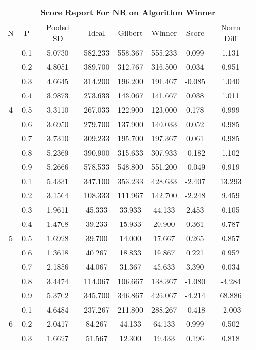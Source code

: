 \documentclass[11pt,a4paper]{report}
\begin{document}
\begin{longtable}{ | c | c || c | c | c | c | c | c | }
\hline
\multicolumn{8}{|c|}{ Score Report For NR on Algorithm Winner} \\
\hline
N & P & Pooled SD &  Ideal &  Gilbert & Winner  & Score & Norm Diff \\
 \hline
 \hline
 \endhead
\multirow{9}{*}{4} & 0.1 & 5.0730 & 582.233 & 558.367 & 555.233 & 0.099 & 1.131 \\
 & 0.2 & 4.8051 & 389.700 & 312.767 & 316.500 & 0.034 & 0.951 \\
 & 0.3 & 4.6645 & 314.200 & 196.200 & 191.467 & -0.085 & 1.040 \\
 & 0.4 & 3.9873 & 273.633 & 143.067 & 141.667 & 0.038 & 1.011 \\
 & 0.5 & 3.3110 & 267.033 & 122.900 & 123.000 & 0.178 & 0.999 \\
 & 0.6 & 3.6950 & 279.700 & 137.900 & 140.033 & 0.052 & 0.985 \\
 & 0.7 & 3.7310 & 309.233 & 195.700 & 197.367 & 0.061 & 0.985 \\
 & 0.8 & 5.2369 & 390.900 & 315.633 & 307.933 & -0.182 & 1.102 \\
 & 0.9 & 5.2666 & 578.533 & 548.800 & 551.200 & -0.049 & 0.919 \\
 \hline
\multirow{9}{*}{5} & 0.1 & 5.4331 & 347.100 & 353.233 & 428.633 & -2.407 & 13.293 \\
 & 0.2 & 3.1564 & 108.333 & 111.967 & 142.700 & -2.248 & 9.459 \\
 & 0.3 & 1.9611 & 45.333 & 33.933 & 44.133 & 2.453 & 0.105 \\
 & 0.4 & 1.4708 & 39.233 & 15.933 & 20.900 & 0.361 & 0.787 \\
 & 0.5 & 1.6928 & 39.700 & 14.000 & 17.667 & 0.265 & 0.857 \\
 & 0.6 & 1.3618 & 40.267 & 18.833 & 19.867 & 0.221 & 0.952 \\
 & 0.7 & 2.1856 & 44.067 & 31.367 & 43.633 & 3.390 & 0.034 \\
 & 0.8 & 3.4474 & 114.067 & 106.667 & 138.367 & -1.080 & -3.284 \\
 & 0.9 & 5.3702 & 345.700 & 346.867 & 426.067 & -4.214 & 68.886 \\
 \hline
\multirow{9}{*}{6} & 0.1 & 4.6484 & 237.267 & 211.800 & 288.267 & -0.418 & -2.003 \\
 & 0.2 & 2.0417 & 84.267 & 44.133 & 64.133 & 0.999 & 0.502 \\
 & 0.3 & 1.6627 & 51.567 & 12.300 & 19.433 & 0.196 & 0.818 \\

\end{longtable}
\end{document}
